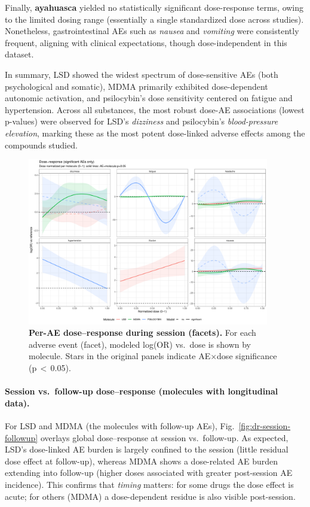 Finally, \textbf{ayahuasca} yielded no statistically significant dose-response terms, owing to the limited dosing range (essentially a single standardized dose across studies).  
Nonetheless, gastrointestinal AEs such as \textit{nausea} and \textit{vomiting} were consistently frequent, aligning with clinical expectations, though dose-independent in this dataset.

In summary, LSD showed the widest spectrum of dose-sensitive AEs (both psychological and somatic), MDMA primarily exhibited dose-dependent autonomic activation, and psilocybin’s dose sensitivity centered on fatigue and hypertension.  
Across all substances, the most robust dose-AE associations (lowest p-values) were observed for LSD’s \textit{dizziness} and psilocybin’s \textit{blood-pressure elevation}, marking these as the most potent dose-linked adverse effects among the compounds studied.


\begin{figure}[htb]
  \centering
  \includegraphics[width=0.94\textwidth]{figures/master_dr_by_ae-session.pdf}
  \caption{\textbf{Per-AE dose–response during session (facets).}
  For each adverse event (facet), modeled log(OR) vs.\ dose is shown by molecule. Stars in the original panels indicate AE$\times$dose significance (p\,$<\,$0.05).}
  \label{fig:dr-by-ae-session}
\end{figure}

\paragraph{Session vs.\ follow-up dose–response (molecules with longitudinal data).}
For LSD and MDMA (the molecules with follow-up AEs), Fig.~\ref{fig:dr-session-followup} overlays global dose–response at session vs.\ follow-up. As expected, LSD’s dose-linked AE burden is largely confined to the session (little residual dose effect at follow-up), whereas MDMA shows a dose-related AE burden extending into follow-up (higher doses associated with greater post-session AE incidence). This confirms that \emph{timing} matters: for some drugs the dose effect is acute; for others (MDMA) a dose-dependent residue is also visible post-session.

